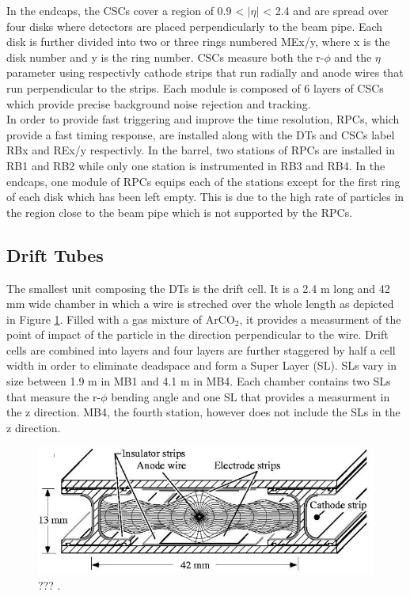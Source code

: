     In the endcaps, the CSCs cover a region of 0.9 < $ | \eta | $ < 2.4 and are spread over four disks where detectors are placed perpendicularly to the beam pipe. Each disk is further divided into two or three rings numbered MEx/y, where x is the disk number and y is the ring number. CSCs measure both the r-$\phi$ and the $ \eta $ parameter using respectivly cathode strips that run radially and anode wires that run perpendicular to the strips. Each module is composed of 6 layers of CSCs which provide precise background noise rejection and tracking. \\

    In order to provide fast triggering and improve the time resolution, RPCs, which provide a fast timing response, are installed along with the DTs and CSCs label RBx and REx/y respectivly. In the barrel, two stations of RPCs are installed in RB1 and RB2 while only one station is instrumented in RB3 and RB4. In the endcaps, one module of RPCs equips each of the stations except for the first ring of each disk which has been left empty. This is due to the high rate of particles in the region close to the beam pipe which is not supported by the RPCs.

    \subsection{Drift Tubes}

      The smallest unit composing the DTs is the drift cell. It is a 2.4 m long and 42 mm wide chamber in which a wire is streched over the whole length as depicted in Figure \ref{fig:I-3-dt}. Filled with a gas mixture of ArCO$_2$, it provides a measurment of the point of impact of the particle in the direction perpendicular to the wire. Drift cells are combined into layers and four layers are further staggered by half a cell width in order to eliminate deadspace and form a Super Layer (SL). SLs vary in size between 1.9 m in MB1 and 4.1 m in MB4. Each chamber contains two SLs that measure the r-$\phi$ bending angle and one SL that provides a measurment in the z direction. MB4, the fourth station, however does not include the SLs in the z direction. \\

      \begin{figure}[h!]
        \centering
        \includegraphics[width=\textwidth]{img/I-3-cms/dt.jpg}
        \caption{??? \cite{1748-0221-3-08-S08004}.}
        \label{fig:I-3-dt}
      \end{figure}

